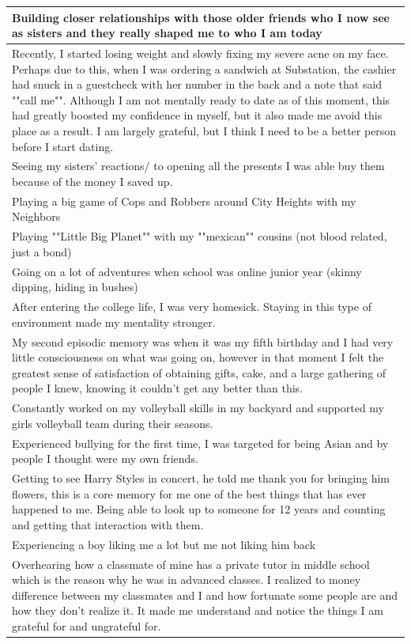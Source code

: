 \documentclass[
  .7em,
  letterpaper,
  DIV=11,
  numbers=noendperiod]{scrartcl}
\begin{document}
\begin{table}
\begin{tabular}{l}
\hline
Building closer relationships with those older friends who I now see as sisters and they really shaped me to who I am today\\
\hline
Recently, I started losing weight and slowly fixing my severe acne on my face. Perhaps due to this, when I was ordering a sandwich at Substation, the cashier had snuck in a guestcheck with her number in the back and a note that said ""call me"". Although I am not mentally ready to date as of this moment, this had greatly boosted my confidence in myself, but it also made me avoid this place as a result. I am largely grateful, but I think I need to be a better person before I start dating.\\
\hline
Seeing my sisters' reactions/ to opening all the presents I was able buy them because of the money I saved up.\\
\hline
Playing a big game of Cops and Robbers around City Heights with my Neighbors\\
\hline
Playing ""Little Big Planet"" with my ""mexican"" cousins (not blood related, just a bond)\\
\hline
Going on a lot of adventures when school was online junior year (skinny dipping, hiding in bushes)\\
\hline
After entering the college life, I was very homesick. Staying in this type of environment made my mentality stronger.\\
\hline
My second episodic memory was when it was my fifth birthday and I had very little consciousness on what was going on, however in that moment I felt the greatest sense of satisfaction of obtaining gifts, cake, and a large gathering of people I knew, knowing it couldn't get any better than this.\\
\hline
Constantly worked on my volleyball skills in my backyard and supported my girls volleyball team during their seasons.\\
\hline
Experienced bullying for the first time, I was targeted for being Asian and by people I thought were my own friends.\\
\hline
Getting to see Harry Styles in concert, he told me thank you for bringing him flowers, this is a core memory for me one of the best things that has ever happened to me. Being able to look up to someone for 12 years and counting and getting that interaction with them.\\
\hline
Experiencing a boy liking me a lot but me not liking him back\\
\hline
Overhearing how a classmate of mine has a private tutor in middle school which is the reason why he was in advanced classes. I realized to money difference between my classmates and I and how fortunate some people are and how they don't realize it. It made me understand and notice the things I am grateful for and ungrateful for.\\

\end{tabular}
\end{table}
\end{document}
